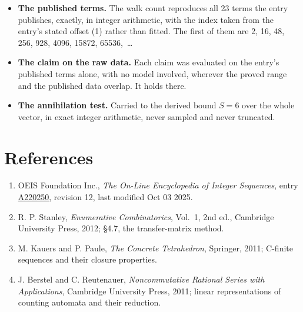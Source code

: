 \documentclass[11pt]{article}
\theoremstyle{definition}
\begin{document}
\begin{itemize}

\item {\bfseries The published terms.} The walk count reproduces all 23 terms the entry publishes, exactly, in integer arithmetic, with the index taken from the entry's stated offset (1) rather than fitted. The first of them are 2, 16, 48, 256, 928, 4096, 15872, 65536,~\dots

\item {\bfseries The claim on the raw data.} Each claim was evaluated on the entry's published terms alone, with no model involved, wherever the proved range and the published data overlap. It holds there.

\item {\bfseries The annihilation test.} Carried to the derived bound $S = 6$ over the whole vector, in exact integer arithmetic, never sampled and never truncated.

\end{itemize}

\section{References}

\begin{enumerate}

\item OEIS Foundation Inc., \emph{The On-Line Encyclopedia of Integer Sequences}, entry \href{https://oeis.org/A220250}{A220250}, revision 12, last modified Oct 03 2025.

\item R. P. Stanley, \emph{Enumerative Combinatorics}, Vol.~1, 2nd ed., Cambridge University Press, 2012; \S4.7, the transfer-matrix method.

\item M. Kauers and P. Paule, \emph{The Concrete Tetrahedron}, Springer, 2011; C-finite sequences and their closure properties.

\item J. Berstel and C. Reutenauer, \emph{Noncommutative Rational Series with Applications}, Cambridge University Press, 2011; linear representations of counting automata and their reduction.

\end{enumerate}
\end{document}
